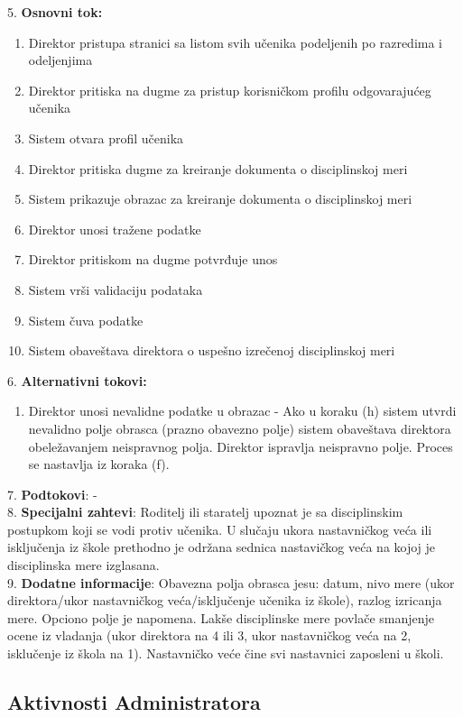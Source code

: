 \documentclass{article}
\begin{document}
5. \textbf{Osnovni tok:} 
\begin{enumerate} [label=(\alph*)]
\item Direktor pristupa stranici sa listom svih učenika podeljenih po razredima i odeljenjima 
\item Direktor pritiska na dugme za pristup korisničkom profilu odgovarajućeg učenika
\item Sistem otvara profil učenika
\item Direktor pritiska dugme za kreiranje dokumenta o disciplinskoj meri
\item Sistem prikazuje obrazac za kreiranje dokumenta o disciplinskoj meri 
\item Direktor unosi tražene podatke
\item Direktor pritiskom na dugme potvrđuje unos
\item Sistem vrši validaciju podataka
\item Sistem čuva podatke
\item Sistem obaveštava direktora o uspešno izrečenoj disciplinskoj meri
\end{enumerate}

6. \textbf{Alternativni tokovi:}
\begin{enumerate} [label=(\roman*)]
\item Direktor unosi nevalidne podatke u obrazac - Ako u koraku (h) sistem utvrdi nevalidno polje obrasca (prazno obavezno polje) sistem obaveštava direktora obeležavanjem neispravnog polja. Direktor ispravlja neispravno polje. Proces se nastavlja iz koraka (f).
\end{enumerate}

7. \textbf{Podtokovi}: - \\

8. \textbf{Specijalni zahtevi}: Roditelj ili staratelj upoznat je sa disciplinskim postupkom koji se vodi protiv učenika. U slučaju ukora nastavničkog veća ili isključenja iz škole prethodno je održana sednica nastavičkog veća na kojoj je disciplinska mere izglasana. \\

9. \textbf{Dodatne informacije}: Obavezna polja obrasca jesu: datum, nivo mere (ukor direktora/ukor nastavničkog veća/isključenje učenika iz škole), razlog izricanja mere. Opciono polje je napomena. Lakše disciplinske mere povlače smanjenje ocene iz vladanja (ukor direktora na 4 ili 3, ukor nastavničkog veća na 2, isklučenje iz škola na 1). Nastavničko veće čine svi nastavnici zaposleni u školi. \\


\newpage
\subsection{Aktivnosti Administratora}
\end{document}
